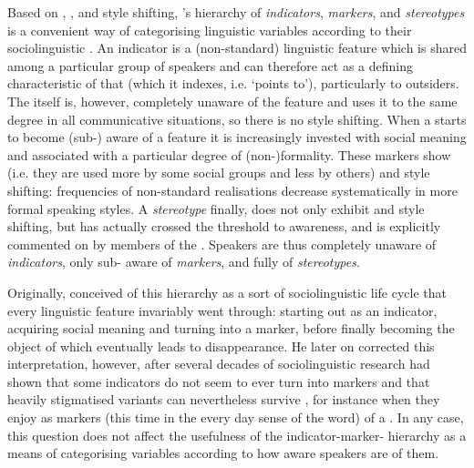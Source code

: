 Based on , , and style shifting, \citeauthor{labov1972}'s \citeyear{labov1972} hierarchy of \emph{indicators}, \emph{markers}, and \emph{stereotypes} is a convenient way of categorising linguistic variables according to their sociolinguistic .
An indicator is a (non-standard) linguistic feature which is shared among a particular group of speakers and can therefore act as a defining characteristic of that  (which it indexes, i.e. `points to'), particularly to outsiders.
The  itself is, however, completely unaware of the feature and uses it to the same degree in all communicative situations, so there is no style shifting.
When a  starts to become (sub-) aware of a feature it is increasingly invested with social meaning and associated with a particular degree of (non-)formality.
These markers show  (i.e. they are used more by some social groups and less by others) and style shifting: frequencies of non-standard realisations decrease systematically in more formal speaking styles.
A \emph{stereotype} finally, does not only exhibit  and style shifting, but has actually crossed the threshold to  awareness, and is explicitly commented on by members of the  \parencite[cf.][178--180]{labov1972}.
Speakers are thus completely unaware of \emph{indicators}, only sub- aware of \emph{markers}, and fully  of \emph{stereotypes}.

Originally, \citeauthor{labov1972} conceived of this hierarchy as a sort of sociolinguistic life cycle that every linguistic feature invariably went through: starting out as an indicator, acquiring social meaning and turning into a marker, before finally becoming the object of  which eventually leads to disappearance.
He later on corrected this interpretation, however, after several decades of sociolinguistic research had shown that some indicators do not seem to ever turn into markers and that heavily stigmatised variants can nevertheless survive \parencite{labov1994}, for instance when they enjoy   as markers (this time in the every day sense of the word) of a .
In any case, this question does not affect the usefulness of the indicator-marker- hierarchy as a means of categorising variables according to how aware speakers are of them.

